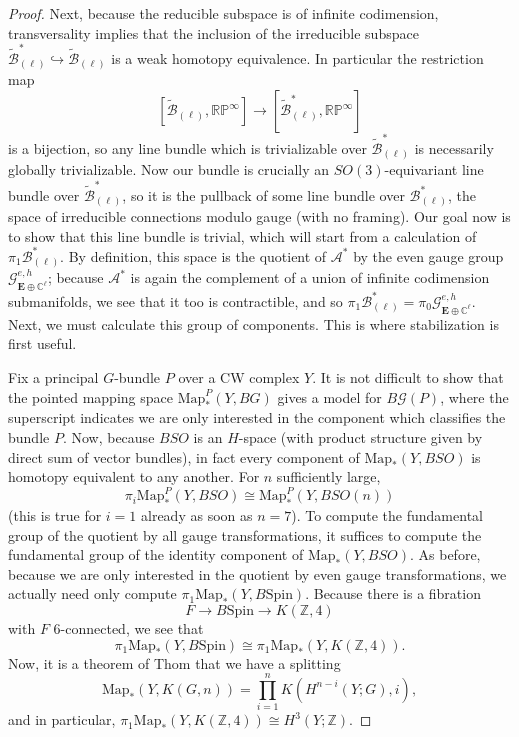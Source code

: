 \documentclass{memo-l}
\theoremstyle{definition}
\theoremstyle{remark}
\numberwithin{section}{chapter}
\numberwithin{equation}{chapter}
\begin{document}
\begin{proof}
Next, because the reducible subspace is of infinite codimension, transversality implies that the inclusion of the irreducible subspace $\widetilde{\mathcal B}_{(\ell)}^* \hookrightarrow \widetilde{\mathcal B}_{(\ell)}$ is a weak homotopy equivalence. In particular the restriction map $$[\widetilde{\mathcal B}_{(\ell)}, \mathbb{RP}^\infty] \to [\widetilde{\mathcal B}_{(\ell)}^*, \mathbb{RP}^\infty]$$ is a bijection, so any line bundle which is trivializable over $\widetilde{\mathcal B}_{(\ell)}^*$ is necessarily globally trivializable. Now our bundle is crucially an $SO(3)$-equivariant line bundle over $\widetilde{\mathcal B}_{(\ell)}^*$, so it is the pullback of some line bundle over $\mathcal B^{*}_{(\ell)}$, the space of irreducible connections modulo gauge (with no framing). Our goal now is to show that this line bundle is trivial, which will start from a calculation of $\pi_1 \mathcal B^*_{(\ell)}$. By definition, this space is the quotient of $\mathcal A^*$ by the even gauge group $\mathcal G^{e,h}_{\mathbf{E} \oplus \mathbb C^\ell}$; because $\mathcal A^*$ is again the complement of a union of infinite codimension submanifolds, we see that it too is contractible, and so $\pi_1 \mathcal B^*_{(\ell)} = \pi_0 \mathcal G^{e,h}_{\mathbf{E} \oplus \mathbb C^\ell}$. Next, we must calculate this group of components. This is where stabilization is first useful.

Fix a principal $G$-bundle $P$ over a CW complex $Y$. It is not difficult to show that the pointed mapping space $\text{Map}^P_*(Y, BG)$ gives a model for $B\mathcal G(P)$, where the superscript indicates we are only interested in the component which classifies the bundle $P$. Now, because $BSO$ is an $H$-space (with product structure given by direct sum of vector bundles), in fact every component of $\text{Map}_*(Y, BSO)$ is homotopy equivalent to any another. For $n$ sufficiently large, 
$$\pi_i \text{Map}^P_*(Y, BSO) \cong \text{Map}^P_*(Y, BSO(n))$$ 
(this is true for $i=1$ already as soon as $n = 7$). To compute the fundamental group of the quotient by all gauge transformations, it suffices to compute the fundamental group of the identity component of $\text{Map}_*(Y, BSO)$. As before, because we are only interested in the quotient by even gauge transformations, we actually need only compute $\pi_1 \text{Map}_*(Y, B\text{Spin})$. Because there is a fibration 
$$F \to B\text{Spin} \to K(\mathbb Z, 4)$$ 
with $F$ 6-connected, we see that 
$$\pi_1 \text{Map}_*(Y, B\text{Spin}) \cong \pi_1 \text{Map}_*(Y, K(\mathbb Z, 4)).$$ 
Now, it is a theorem of Thom \cite{ThomMappingSpaces} that we have a splitting $$\text{Map}_*(Y, K(G,n)) = \prod_{i=1}^n K(H^{n-i}(Y;G), i),$$ and in particular, $\pi_1 \text{Map}_*(Y, K(\mathbb Z, 4)) \cong H^3(Y;\mathbb Z)$.


\end{proof}
\end{document}
